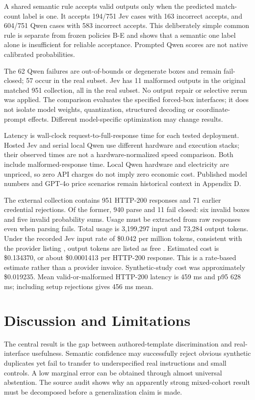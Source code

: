 \documentclass[10pt]{article}
\begin{document}
A shared semantic rule accepts valid outputs only when the predicted match-count label is one. It accepts 194/751 Jev cases with 163 incorrect accepts, and 604/751 Qwen cases with 583 incorrect accepts. This deliberately simple common rule is separate from frozen policies B-E and shows that a semantic one label alone is insufficient for reliable acceptance. Prompted Qwen scores are not native calibrated probabilities.

The 62 Qwen failures are out-of-bounds or degenerate boxes and remain fail-closed; 57 occur in the real subset. Jev has 11 malformed outputs in the original matched 951 collection, all in the real subset. No output repair or selective rerun was applied. The comparison evaluates the specified forced-box interfaces; it does not isolate model weights, quantization, structured decoding or coordinate-prompt effects. Different model-specific optimization may change results.

Latency is wall-clock request-to-full-response time for each tested deployment. Hosted Jev and serial local Qwen use different hardware and execution stacks; their observed times are not a hardware-normalized speed comparison. Both include malformed-response time. Local Qwen hardware and electricity are unpriced, so zero API charges do not imply zero economic cost. Published model numbers and GPT-4o price scenarios remain historical context in Appendix D.

The external collection contains 951 HTTP-200 responses and 71 earlier credential rejections. Of the former, 940 parse and 11 fail closed: six invalid boxes and five invalid probability sums. Usage must be extracted from raw responses even when parsing fails. Total usage is 3,199,297 input and 73,284 output tokens. Under the recorded Jev input rate of \$0.042 per million tokens, consistent with the provider listing \cite{ref9}, output tokens are listed as free \cite{ref9}. Estimated cost is \$0.134370, or about \$0.0001413 per HTTP-200 response. This is a rate-based estimate rather than a provider invoice. Synthetic-study cost was approximately \$0.019235. Mean valid-or-malformed HTTP-200 latency is 459 ms and p95 628 ms; including setup rejections gives 456 ms mean.

\section{Discussion and Limitations}
The central result is the gap between authored-template discrimination and real-interface usefulness. Semantic confidence may successfully reject obvious synthetic duplicates yet fail to transfer to underspecified real instructions and small controls. A low marginal error can be obtained through almost universal abstention. The source audit shows why an apparently strong mixed-cohort result must be decomposed before a generalization claim is made.
\end{document}
